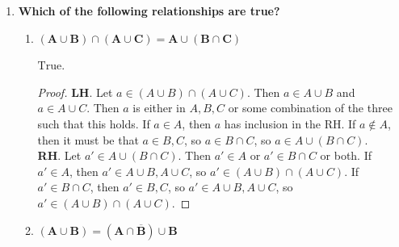 \documentclass[10pt, oneside]{article}
\begin{document}
\begin{enumerate}[label=1.\arabic*]
\begin{enumerate}
	$A \cap B = \{ x \ | \ 1/2 < x \leq 1 \} \implies \boxed{ \overline{A \cap B} = \{ x \ | \ 0 \leq x \leq 1/2, 1 < x \leq 2 \} }$
	
	\item  \begin{tcolorbox}[
	  colback=Cerulean!5!white,
	  colframe=Cerulean!75!black]
	\textbf{$\bm{\overline{A} \cap B}$}
	\end{tcolorbox}
	
	$\overline{A} = \{ x \ | \ 0 \leq x \leq 1/2, 1 < x \leq 2 \} \implies \boxed{\overline{A} \cap B = \{ x \ | \ 1/4 \leq x \leq 1/2, 1 < x < 3/2 \}}$
	
	\end{enumerate}

\item  \begin{tcolorbox}[
  colback=Cerulean!5!white,
  colframe=Cerulean!75!black]
\textbf{Which of the following relationships are true?}
\end{tcolorbox}

	\begin{enumerate}
	\item  \begin{tcolorbox}[
	  colback=Cerulean!5!white,
	  colframe=Cerulean!75!black]
	\textbf{$\bm{(A \cup B) \cap (A \cup C) = A \cup (B \cap C)}$}
	\end{tcolorbox}
	
	$\boxed{\text{True}}$.
	
	\begin{proof}
	\textbf{LH}. Let $a \in (A \cup B) \cap (A \cup C)$. Then $a \in A \cup B$ and $a \in A \cup C$. Then $a$ is either in $A, B, C$ or some combination of the three such that this holds. If $a \in A$, then $a$ has inclusion in the RH. If $a \notin A$, then it must be that $a \in B, C$, so $a \in B \cap C$, so $a \in A \cup (B \cap C)$. \\
	
	\textbf{RH}. Let $a' \in A \cup (B \cap C)$. Then $a' \in A$ or $a' \in B \cap C$ or both. If $a' \in A$, then $a' \in A \cup B, A \cup C$, so $a' \in (A \cup B) \cap (A \cup C)$. If $a' \in B \cap C$, then $a' \in B, C$, so $a' \in A \cup B, A \cup C$, so $a' \in (A \cup B) \cap (A \cup C)$.
	\end{proof}

	\item  \begin{tcolorbox}[
	  colback=Cerulean!5!white,
	  colframe=Cerulean!75!black]
	\textbf{$\bm{(A \cup B) = (A \cap \overline{B}) \cup B}$}
	\end{tcolorbox}
	

\end{enumerate}
\end{enumerate}
\end{document}
